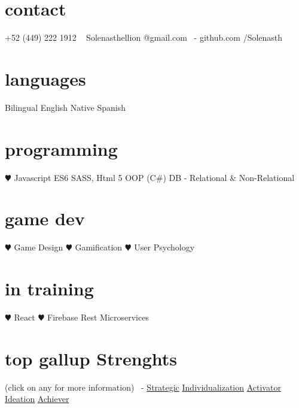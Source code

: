 \documentclass[]{cv-style}          %
\begin{document}

\lastupdated


\begin{aside}
%
\section{contact}
+52 (449) 222 1912
~
Solenasthellion
@gmail.com
~-
github.com
/Solenasth
%
\section{languages}
Bilingual English
Native Spanish
%
\section{programming}
{\color{red} $\varheartsuit$} Javascript ES6
SASS, Html 5
OOP (C\#)
DB - Relational \& Non-Relational
\section{game dev}
{\color{red} $\varheartsuit$} Game Design
{\color{red} $\varheartsuit$} Gamification
{\color{red} $\varheartsuit$} User Psychology
\section{in training}
{\color{red} $\varheartsuit$} React
{\color{red} $\varheartsuit$} Firebase
Rest Microservices
\section{top gallup Strenghts}
(click on any for more information)
~-
\href{https://news.gallup.com/businessjournal/718/strategic.aspx}{Strategic}
\href{https://news.gallup.com/businessjournal/685/individualization.aspx}{Individualization}
\href{https://news.gallup.com/businessjournal/625/activator.aspx}{Activator}
\href{https://news.gallup.com/businessjournal/679/ideation.aspx}{Ideation}
\href{https://news.gallup.com/businessjournal/622/achiever.aspx}{Achiever}
%
\end{aside}

\end{document}
